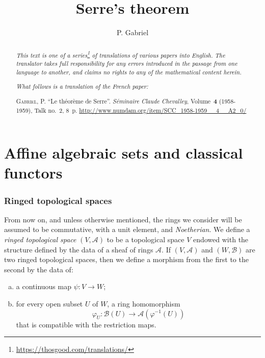 \documentclass{article}
\title{Serre's theorem}
\author{P. Gabriel}
\date{}
\theoremstyle{plain}
\newcommand{\sh}{\mathscr}
\newcommand{\oldpage}[1]{\marginpar{\footnotesize$\Big\vert$ \textit{p.~#1}}}
\begin{document}
\maketitle
\thispagestyle{fancy}

\renewcommand{\abstractname}{Translator's note.}

\begin{abstract}
  \renewcommand*{\thefootnote}{\fnsymbol{footnote}}
  \emph{This text is one of a series\footnote{\url{https://thosgood.com/translations/}} of translations of various papers into English.}
  \emph{The translator takes full responsibility for any errors introduced in the passage from one language to another, and claims no rights to any of the mathematical content herein.}
  
  \emph{What follows is a translation of the French paper:}

  \medskip\noindent
  \textsc{Gabriel, P.}
  ``Le th\'{e}or\`{e}me de Serre''.
  \emph{S\'{e}minaire Claude Chevalley}, Volume~\textbf{4} (1958-1959), Talk no.~2, 8~p.
  {\footnotesize\url{http://www.numdam.org/item/SCC_1958-1959__4__A2_0/}}
\end{abstract}

\setcounter{footnote}{0}

\tableofcontents
\bigskip



\part{Affine algebraic sets and classical functors}
\label{chapterA}


\section{Ringed topological spaces}
\label{section1}

\oldpage{2-01}

From now on, and unless otherwise mentioned, the rings we consider will be assumed to be commutative, with a unit element, and \emph{Noetherian}.
We define a \emph{ringed topological space} $(V,\sh{A})$ to be a topological space $V$ endowed with the structure defined by the data of a sheaf of rings $\sh{A}$.
If $(V,\sh{A})$ and $(W,\sh{B})$ are two ringed topological spaces, then we define a morphism from the first to the second by the data of:
\begin{enumerate}[(a)]
  \item a continuous map $\psi\colon V\to W$;
  \item for every open subset $U$ of $W$, a ring homomorphism
    \[
      \varphi_U\colon\sh{B}(U)\to\sh{A}(\varphi^{-1}(U))
    \]
    that is compatible with the restriction maps.
\end{enumerate}
\end{document}
